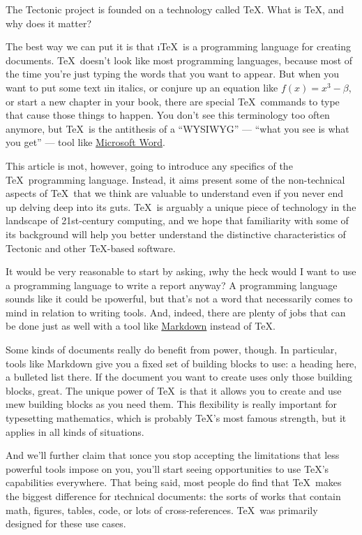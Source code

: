 
The Tectonic project is founded on a technology called \TeX. What is \TeX, and
why does it matter?

The best way we can put it is that \i{\TeX\ is a programming language for
creating documents}. \TeX\ doesn't look like most programming languages, because
most of the time you're just typing the words that you want to appear. But when
you want to put some text \i{in italics}, or conjure up an equation like $f(x) =
x^3 - \beta$, or start a new chapter in your book, there are special \TeX\
commands to type that cause those things to happen. You don’t see this
terminology too often anymore, but \TeX\ is the antithesis of a “WYSIWYG” —
“what you see is what you get” — tool like
\href{https://www.microsoft.com/en-us/microsoft-365/word}{Microsoft Word}.

This article is \i{not}, however, going to introduce any specifics of the \TeX\
programming language. Instead, it aims present some of the non-technical aspects
of \TeX\ that we think are valuable to understand even if you never end up
delving deep into its guts. \TeX\ is arguably a unique piece of technology in
the landscape of 21st-century computing, and we hope that familiarity with some
of its background will help you better understand the distinctive
characteristics of Tectonic and other \TeX-based software.

It would be very reasonable to start by asking, \i{why the heck would I want to
use a programming language to write a report anyway?} A programming language
sounds like it could be \i{powerful}, but that's not a word that necessarily
comes to mind in relation to writing tools. And, indeed, there are plenty of
jobs that can be done just as well with a tool like
\href{https://en.wikipedia.org/wiki/Markdown}{Markdown} instead of \TeX.

Some kinds of documents really do benefit from power, though. In particular,
tools like Markdown give you a fixed set of building blocks to use: a heading
here, a bulleted list there. If the document you want to create uses only those
building blocks, great. The unique power of \TeX\ is that it allows you to
create and use \i{new} building blocks as you need them. This flexibility is
really important for typesetting mathematics, which is probably \TeX's most
famous strength, but it applies in all kinds of situations.

And we'll further claim that \i{once you stop accepting the limitations that
less powerful tools impose on you, you'll start seeing opportunities to use
\TeX's capabilities everywhere}. That being said, most people do find that \TeX\
makes the biggest difference for \i{technical documents}: the sorts of works
that contain math, figures, tables, code, or lots of cross-references. \TeX\ was
primarily designed for these use cases.

